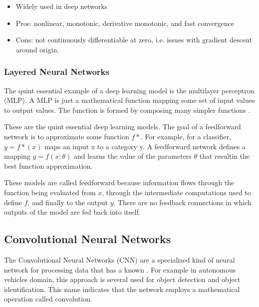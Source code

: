     \begin{itemize}
        \item Widely used in deep networks
        \item Pros: nonlinear, monotonic, derivative monotonic, and fast convergence
        \item Cons: not continuously differentiable at zero, i.e. issues with gradient descent around origin.
    \end{itemize}

\subsubsection{Layered Neural Networks}

The quint essential example of a deep learning model is the multilayer perceptron (MLP). A MLP is just a mathematical function mapping some set of input values to output values. The function
is formed by composing many simpler functions \cite{goodfellow2016deep}.


These are the quint essential deep learning models. The goal
of a feedforward network is to approximate some function $f*$. For example, for a classifier, $y = f*(x)$ maps an input x to a category y. A feedforward network
defines a mapping $y = f (x; \theta)$ and learns the value of the parameters $\theta$ that resultin the best function approximation.

These models are called feedforward because information flows through the function being evaluated from $x$, through the intermediate computations used to define $f$, and finally to the output $y$. There are no feedback connections in which outputs of the model are fed back into itself.



\subsection{Convolutional Neural Networks}\label{sec:cnn}


The Convolutional Neural Networks (CNN) are a specialized kind of neural network for processing data that has a known \cite{lecun1995convolutional}. For example in autonomous vehicles domain, this approach is several used for object detection and object identification. This name  indicates that the network employs a mathematical operation called
convolution. 


